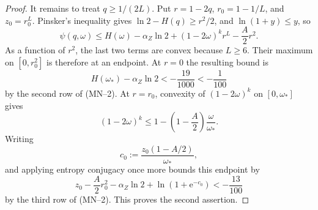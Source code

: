\documentclass[10pt,a4paper]{amsart}
\begin{document}
\begin{proof}
It remains to treat \(q\ge1/(2L)\).  Put
\(r=1-2q\), \(r_0=1-1/L\), and \(z_0=r_0^L\).  Pinsker's inequality gives
\(\ln2-H(q)\ge r^2/2\), and \(\ln(1+y)\le y\), so
\[
\psi(q,\omega)
\le H(\omega)-\alpha_Z\ln2
+(1-2\omega)^kr^L-\frac A2r^2.
\]
As a function of \(r^2\), the last two terms are convex because \(L\ge6\).
Their maximum on \([0,r_0^2]\) is therefore at an endpoint.  At \(r=0\)
the resulting bound is
\[
H(\omega_*)-\alpha_Z\ln2<-\frac{19}{1000}<-\frac1{100}
\]
by the second row of (MN--2).
At \(r=r_0\), convexity of \((1-2\omega)^k\) on
\([0,\omega_*]\) gives
\[
(1-2\omega)^k
\le1-\left(1-\frac A2\right)\frac\omega{\omega_*}.
\]
Writing
\[
c_0:=\frac{z_0(1-A/2)}{\omega_*},
\]
and applying entropy conjugacy once more bounds this endpoint by
\[
z_0-\frac A2r_0^2-\alpha_Z\ln2+\ln(1+\mathrm e^{-c_0})
<-\frac{13}{100}
\]
by the third row of (MN--2).
This proves the second assertion.
\end{proof}
\end{document}
